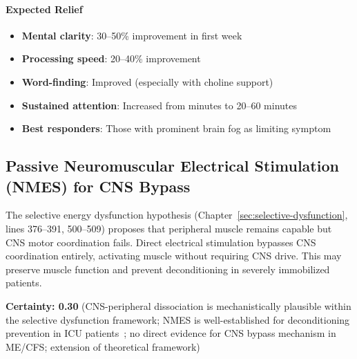 \paragraph{Expected Relief}
\begin{itemize}
    \item \textbf{Mental clarity}: 30--50\% improvement in first week
    \item \textbf{Processing speed}: 20--40\% improvement
    \item \textbf{Word-finding}: Improved (especially with choline support)
    \item \textbf{Sustained attention}: Increased from minutes to 20--60 minutes
    \item \textbf{Best responders}: Those with prominent brain fog as limiting symptom
\end{itemize}

\subsection{Passive Neuromuscular Electrical Stimulation (NMES) for CNS Bypass}
\label{subsec:nmes-cns-bypass}

\begin{hypothesis}
The selective energy dysfunction hypothesis (Chapter~\ref{sec:selective-dysfunction}, lines 376--391, 500--509) proposes that peripheral muscle remains capable but CNS motor coordination fails. Direct electrical stimulation bypasses CNS coordination entirely, activating muscle without requiring CNS drive. This may preserve muscle function and prevent deconditioning in severely immobilized patients.

\textbf{Certainty: 0.30} (CNS-peripheral dissociation is mechanistically plausible within the selective dysfunction framework; NMES is well-established for deconditioning prevention in ICU patients~\cite{Wirth2023}; no direct evidence for CNS bypass mechanism in ME/CFS; extension of theoretical framework)
\end{hypothesis}

